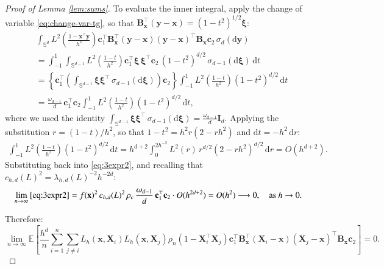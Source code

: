 \documentclass[12pt]{report} %
\newcommand{\bX}{\mathbf{X}}
\newcommand{\bx}{\mathbf{x}}
\newcommand{\by}{\mathbf{y}}
\newcommand{\bc}{\mathbf{c}}
\newcommand{\bxi}{\boldsymbol{\xi}}
\newcommand{\sigmad}{\sigma_{d}}
\newcommand{\sigmadm}{\sigma_{d-1}}
\newcommand{\rd}{\mathrm{d}}
\newcommand{\Sd}{\mathbb{S}^{d}}
\newcommand{\Sdm}{\mathbb{S}^{d-1}}
\newcommand{\bB}{\mathbf{B}}
\begin{document}
\begin{proof}[Proof of Lemma \ref{lem:sums}]
To evaluate the inner integral, apply the change of variable \eqref{eq:change-var-tg}, so that $\bB_{\bx}^\top(\by - \bx) = (1-t^2)^{1/2}\bxi$:
\begin{align*}
&\int_{\Sd} 
L^2\!\left(\frac{1-\bx^\top\by}{h^2}\right)
\bc_1^\top\bB_{\bx}^\top\left(\by-\bx\right)\left(\by-\bx\right)^\top\bB_{\bx}\bc_2
\,\sigmad(\rd\by) \\
&= \int_{-1}^{1}\int_{\Sdm}
L^2\!\left(\frac{1-t}{h^2}\right)
\bc_1^\top\bxi\,\bxi^\top\bc_2\,
(1-t^2)^{d/2}
\,\sigmadm(\rd\bxi)\,\rd t \\
&= \left\{\bc_1^\top\left(\int_{\Sdm}\bxi\bxi^\top\,\sigmadm(\rd\bxi)\right)\bc_2\right\}
\int_{-1}^{1}
L^2\!\left(\frac{1-t}{h^2}\right)
(1-t^2)^{d/2}
\,\rd t \\
&= \frac{\omega_{d-1}}{d}\,\bc_1^\top\bc_2
\int_{-1}^{1}
L^2\!\left(\frac{1-t}{h^2}\right)
(1-t^2)^{d/2}
\,\rd t,
\end{align*}
where we used the identity $\int_{\Sdm}\bxi\bxi^\top\,\sigmadm(\rd\bxi) = \frac{\omega_{d-1}}{d}\mathbf{I}_d$. Applying the substitution $r = (1-t)/h^2$, so that $1-t^2 = h^2 r(2-rh^2)$ and $\rd t = -h^2\,\rd r$:
\begin{align*}
\int_{-1}^{1}
L^2\!\left(\frac{1-t}{h^2}\right)
(1-t^2)^{d/2}
\,\rd t
= h^{d+2}\int_{0}^{2h^{-2}} L^2(r)\,r^{d/2}(2-rh^2)^{d/2}\,\rd r
= O(h^{d+2}).
\end{align*}
Substituting back into \eqref{eq:3expr2}, and recalling that $c_{h,d}(L)^2 = \lambda_{h,d}(L)^{-2}h^{-2d}$:
\begin{align*}
\lim_{n\to\infty}\eqref{eq:3expr2} 
= f(\bx)^2\, c_{h,d}(L)^2\,\rho_c\,\frac{\omega_{d-1}}{d}\,\bc_1^\top\bc_2 \cdot O(h^{2d+2})
= O(h^2) \longrightarrow 0, \quad \text{as } h \to 0.
\end{align*}

Therefore:
\begin{equation*}
\lim_{n \to \infty}\mathbb{E}\!\left[
\frac{h^d}{n} \sum_{i=1}^n\sum_{j\neq i} 
L_h\left(\bx, \bX_i\right)L_h\left(\bx, \bX_j\right)
\rho_n\left(1-\bX_i^\top\bX_j\right)
\bc_1^\top\bB_{\bx}^\top\left(\bX_i -\bx\right)\left(\bX_j-\bx\right)^\top\bB_{\bx}\bc_2
\right] = 0.
\end{equation*}


\end{proof}
\end{document}
